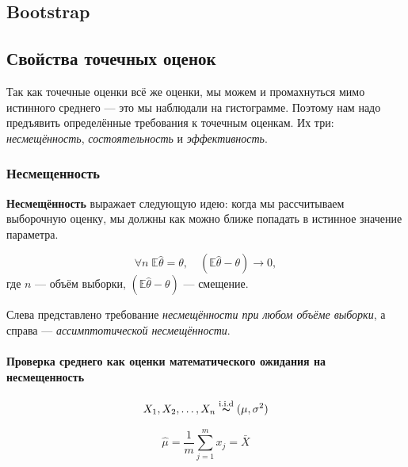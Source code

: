 \documentclass[
  letterpaper,
  DIV=11,
  numbers=noendperiod]{scrreprt}
\let\oldparagraph\paragraph
\renewcommand{\paragraph}[1]{\oldparagraph{#1}\mbox{}}
\theoremstyle{definition}
\theoremstyle{remark}
\begin{document}
\subsection{Bootstrap}\label{bootstrap}

\subsection{Свойства точечных
оценок}\label{ux441ux432ux43eux439ux441ux442ux432ux430-ux442ux43eux447ux435ux447ux43dux44bux445-ux43eux446ux435ux43dux43eux43a}

Так как точечные оценки всё же оценки, мы можем и промахнуться мимо
истинного среднего --- это мы наблюдали на гистограмме. Поэтому нам надо
предъявить определённые требования к точечным оценкам. Их три:
\emph{несмещённость}, \emph{состоятельность} и \emph{эффективность}.

\subsubsection{Несмещенность}\label{ux43dux435ux441ux43cux435ux449ux435ux43dux43dux43eux441ux442ux44c}

\textbf{Несмещённость} выражает следующую идею: когда мы рассчитываем
выборочную оценку, мы должны как можно ближе попадать в истинное
значение параметра.

\[
\forall n \; \mathbb{E} \hat \theta = \theta, \quad (\mathbb{E}\hat \theta - \theta) \rightarrow 0,
\] где \(n\) --- объём выборки, \((\mathbb{E}\hat \theta - \theta)\) ---
смещение.

Слева представлено требование \emph{несмещённости при любом объёме
выборки}, а справа --- \emph{ассимптотической несмещённости}.

\paragraph{Проверка среднего как оценки математического ожидания на
несмещенность}\label{ux43fux440ux43eux432ux435ux440ux43aux430-ux441ux440ux435ux434ux43dux435ux433ux43e-ux43aux430ux43a-ux43eux446ux435ux43dux43aux438-ux43cux430ux442ux435ux43cux430ux442ux438ux447ux435ux441ux43aux43eux433ux43e-ux43eux436ux438ux434ux430ux43dux438ux44f-ux43dux430-ux43dux435ux441ux43cux435ux449ux435ux43dux43dux43eux441ux442ux44c}

\[ 
X_1, X_2, \dots , X_n \overset{\text{i.i.d}}{\thicksim} (\mu, \sigma^2)
\]

\[
\hat \mu = \frac{1}{m}\sum_{j=1}^m x_j = \bar X 
\]
\end{document}
